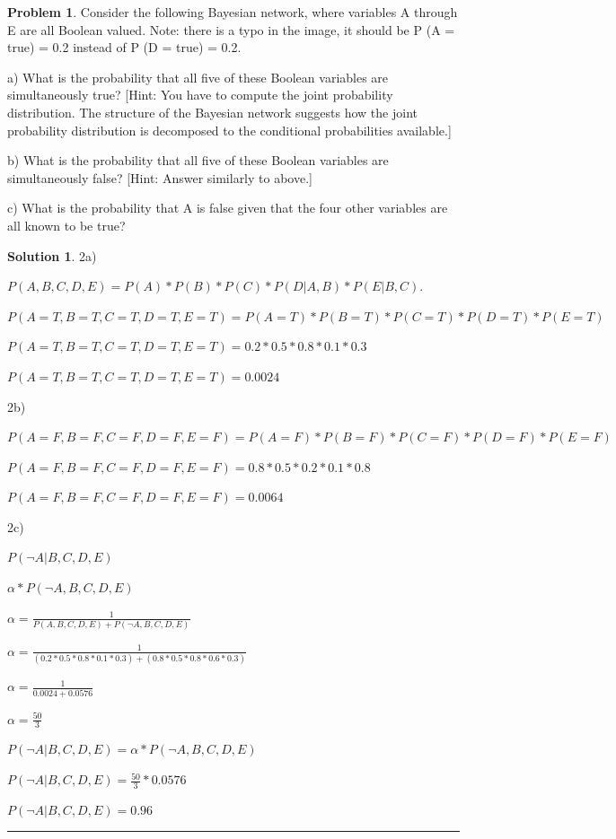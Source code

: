 \documentclass{article}
\theoremstyle{definition}
\newtheorem{problem}{Problem}
\def\fline{\rule{0.75\linewidth}{0.5pt}}
\newcommand{\finishline}{\begin{center}\fline\end{center}}
\newtheorem*{solution*}{Solution}
\newenvironment{solution}{\begin{solution*}}{{\finishline} \end{solution*}}
\begin{document}
\begin{problem} %
	\item Consider the following Bayesian network, where variables A through E are all Boolean valued. Note: there is a typo in the image, it should be P (A = true) = 0.2 instead of P (D = true) = 0.2.
    \item a) What is the probability that all five of these Boolean variables are simultaneously true?
    [Hint: You have to compute the joint probability distribution. The structure of the Bayesian network suggests how the joint probability distribution is decomposed to the conditional probabilities available.]
    \item b) What is the probability that all five of these Boolean variables are simultaneously false?
    [Hint: Answer similarly to above.]
    \item c) What is the probability that A is false given that the four other variables are all known to be true?

\end{problem}

\begin{solution}
	\item 2a)
	\item $P(A,B,C,D,E) = P(A) * P(B) * P(C) * P(D | A,B) * P(E | B,C)$.
	\item $P(A=T,B=T,C=T,D=T,E=T) = P(A=T)*P(B=T)*P(C=T)*P(D=T)*P(E=T) $
	\item $P(A=T,B=T,C=T,D=T,E=T) = 0.2 * 0.5 * 0.8 * 0.1 * 0.3 $
	\item $P(A=T,B=T,C=T,D=T,E=T) = 0.0024$

	\item 2b)
	\item $P(A=F,B=F,C=F,D=F,E=F) = P(A=F)*P(B=F)*P(C=F)*P(D=F)*P(E=F)$
    	\item $P(A=F,B=F,C=F,D=F,E=F) = 0.8 * 0.5 * 0.2 * 0.1 * 0.8 $
        \item $P(A=F,B=F,C=F,D=F,E=F) = 0.0064$

	\item 2c)
	\item $P(\neg A| B,C,D,E)$ 
        \item $\alpha * P(\neg A,B,C,D,E)$
        \item $\alpha =  \frac{1}{P(A,B,C,D,E)+P(\neg A,B,C,D,E)}$
        \item $\alpha = \frac{1}{(0.2 * 0.5 * 0.8 * 0.1 * 0.3)+(0.8 * 0.5 * 0.8 * 0.6 * 0.3)}$
        \item $\alpha = \frac{1}{0.0024+0.0576}$
        \item $\alpha = \frac{50}{3}$
        \item $P(\neg A| B,C,D,E) = \alpha * P(\neg A,B,C,D,E)$
        \item $P(\neg A| B,C,D,E) = \frac{50}{3} * 0.0576$
        \item $P(\neg A| B,C,D,E) = 0.96$

\end{solution}
\end{document}
